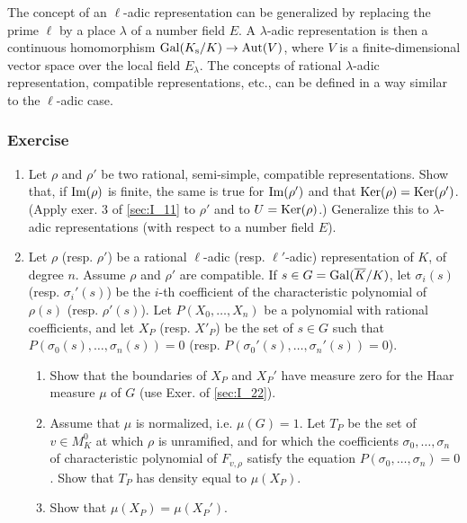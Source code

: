 \begin{obs}
The concept of an $\ell$-adic representation can be generalized by replacing the prime $\ell$ by a place $\lambda$ of a number field  $E$. A $\lambda$-adic representation is then a continuous homomorphism $\operatorname{Gal}(K_{\mathrm{s}}/K) \to \operatorname{Aut}(V)$, where $V$ is a finite-dimensional vector space over the local field $E_\lambda$. The concepts of rational $\lambda$-adic representation, compatible representations, etc., can be defined in a way similar to the $\ell$-adic case.
\end{obs}

\subsubsection*{Exercise}
\begin{enumerate}
	\item Let $\rho$ and $\rho'$ be two rational, semi-simple, compatible representations. Show that, if $\operatorname{Im}(\rho)$ is finite, the same is true for $\operatorname{Im}(\rho')$ and that $\operatorname{Ker}(\rho) = \operatorname{Ker}(\rho')$. (Apply exer. 3 of \ref{sec:I_11} to $\rho'$ and to $U = \operatorname{Ker}(\rho)$.) Generalize this to $\lambda$-adic representations (with respect to a number field $E$).
	\item Let $\rho$ (resp. $\rho'$) be a rational $\ell$-adic (resp. $\ell'$-adic) representation of $K$, of degree $n$. Assume $\rho$ and $\rho'$ are compatible. If $s \in G = \operatorname{Gal}(\overline{K}/K)$, let $\sigma_i(s)$ (resp. $\sigma_i'(s)$) be the
\dpage 
	$i$-th coefficient of the characteristic polynomial of $\rho(s)$ (resp. $\rho'(s)$). Let $P(X_0,\hdots,X_n)$ be a polynomial with rational coefficients, and let $X_P$ (resp. $X'_P$) be the set of $s \in G$ such that $P(\sigma_0(s),\hdots,\sigma_n(s)) = 0$ (resp. $P(\sigma_0'(s),\hdots,\sigma_n'(s)) = 0$).
	\begin{enumerate}
		\item Show that the boundaries of $X_P$ and $X_P'$ have measure zero for the Haar measure $\mu$ of $G$ (use Exer. of \ref{sec:I_22}).
		\item Assume that $\mu$ is normalized, i.e. $\mu(G) = 1$. Let $T_P$ be the set of $v \in M_K^0$ at which $\rho$ is unramified, and for which the coefficients $\sigma_0,\hdots,\sigma_n$ of characteristic polynomial of $F_{v,\rho}$ satisfy the equation $P(\sigma_0,\hdots,\sigma_n) = 0$. Show that $T_P$ has density equal to $\mu(X_P)$.
		\item Show that $\mu(X_P) = \mu(X_P')$.
	\end{enumerate}
\end{enumerate}

